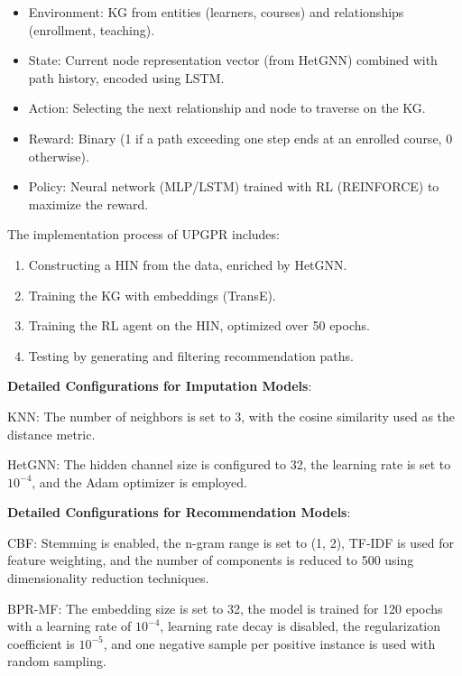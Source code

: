 \documentclass{ieeeaccess}
\begin{document}
\begin{itemize}
    \item Environment: KG from entities (learners, courses) and relationships (enrollment, teaching).
    
    \item State: Current node representation vector (from HetGNN) combined with path history, encoded using LSTM.
    
    \item Action: Selecting the next relationship and node to traverse on the KG.
    
    \item Reward: Binary (1 if a path exceeding one step ends at an enrolled course, 0 otherwise).
    
    \item Policy: Neural network (MLP/LSTM) trained with RL (REINFORCE) to maximize the reward.
\end{itemize}

The implementation process of UPGPR \cite{frej2024upgpr} includes:
\begin{enumerate}
    \item Constructing a HIN from the data, enriched by HetGNN.
    \item Training the KG with embeddings (TransE).
    \item Training the RL agent on the HIN, optimized over 50 epochs.
    \item Testing by generating and filtering recommendation paths.
\end{enumerate}

\textbf{Detailed Configurations for Imputation Models}:

KNN: The number of neighbors is set to 3, with the cosine similarity used as the distance metric.

HetGNN: The hidden channel size is configured to 32, the learning rate is set to \(10^{-4}\), and the Adam optimizer is employed.


\textbf{Detailed Configurations for Recommendation Models}:
      
    CBF: Stemming is enabled, the n-gram range is set to (1, 2), TF-IDF is used for feature weighting, and the number of components is reduced to 500 using dimensionality reduction techniques.
    
    BPR-MF: The embedding size is set to 32, the model is trained for 120 epochs with a learning rate of \(10^{-4}\), learning rate decay is disabled, the regularization coefficient is \(10^{-5}\), and one negative sample per positive instance is used with random sampling.
    
\end{document}
